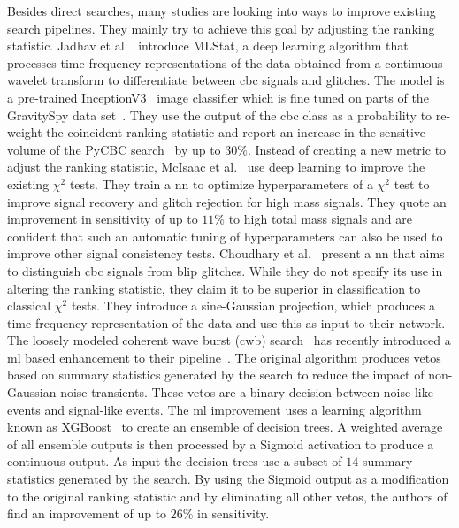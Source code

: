 Besides direct searches, many studies are looking into ways to improve existing search pipelines. They mainly try to achieve this goal by adjusting the ranking statistic. Jadhav et al.~\cite{Jadhav:2020oyt} introduce MLStat, a deep learning algorithm that processes time-frequency representations of the data obtained from a continuous wavelet transform to differentiate between \acrshort{cbc} signals and glitches. The model is a pre-trained InceptionV3~\cite{Szegedy:2016aab} image classifier which is fine tuned on parts of the GravitySpy data set~\cite{Zevin:2016qwy}. They use the output of the \acrshort{cbc} class as a probability to re-weight the coincident ranking statistic and report an increase in the sensitive volume of the PyCBC search~\cite{Usman:2015kfa} by up to $30\%$. Instead of creating a new metric to adjust the ranking statistic, McIsaac et al.~\cite{McIsaac:2022odb} use deep learning to improve the existing $\chi^2$ tests. They train a \acrshort{nn} to optimize hyperparameters of a $\chi^2$ test to improve signal recovery and glitch rejection for high mass signals. They quote an improvement in sensitivity of up to $11\%$ to high total mass signals and are confident that such an automatic tuning of hyperparameters can also be used to improve other signal consistency tests. Choudhary et al.~\cite{Choudhary:2022yje} present a \acrshort{nn} that aims to distinguish \acrshort{cbc} signals from blip glitches. While they do not specify its use in altering the ranking statistic, they claim it to be superior in classification to classical $\chi^2$ tests. They introduce a sine-Gaussian projection, which produces a time-frequency representation of the data and use this as input to their network. The loosely modeled coherent wave burst (\acrshort{cwb}) search~\cite{Klimenko:2005xv, Klimenko:2015ypf} has recently introduced a \acrshort{ml} based enhancement to their pipeline~\cite{Mishra:2021tmu}. The original algorithm produces vetos based on summary statistics generated by the search to reduce the impact of non-Gaussian noise transients. These vetos are a binary decision between noise-like events and signal-like events. The \acrshort{ml} improvement uses a learning algorithm known as XGBoost~\cite{XGBoost} to create an ensemble of decision trees. A weighted average of all ensemble outputs is then processed by a Sigmoid activation to produce a continuous output. As input the decision trees use a subset of $14$ summary statistics generated by the search. By using the Sigmoid output as a modification to the original ranking statistic and by eliminating all other vetos, the authors of \cite{Mishra:2021tmu} find an improvement of up to $26\%$ in sensitivity.

